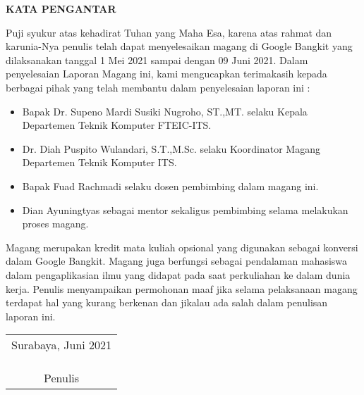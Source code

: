 \begin{center}
  \Large\textbf{KATA PENGANTAR}
\end{center}
\vspace{2ex}


Puji syukur atas kehadirat Tuhan yang Maha Esa, karena atas rahmat dan karunia-Nya penulis telah dapat menyelesaikan magang di Google Bangkit yang dilaksanakan tanggal 1 Mei 2021 sampai dengan 09 Juni 2021. Dalam penyelesaian Laporan Magang ini, kami mengucapkan terimakasih kepada berbagai pihak yang telah membantu dalam penyelesaian laporan ini :

\begin{itemize}
  \item Bapak Dr. Supeno Mardi Susiki Nugroho, ST.,MT. selaku Kepala Departemen Teknik Komputer FTEIC-ITS.
  \item Dr. Diah Puspito Wulandari, S.T.,M.Sc. selaku Koordinator Magang Departemen Teknik Komputer ITS.
  \item Bapak Fuad Rachmadi selaku dosen pembimbing dalam magang ini.
  \item Dian Ayuningtyas sebagai mentor sekaligus pembimbing selama melakukan proses magang.
\end{itemize}

Magang merupakan kredit mata kuliah opsional yang digunakan sebagai konversi dalam Google Bangkit. Magang juga berfungsi sebagai pendalaman mahasiswa dalam pengaplikasian ilmu yang didapat pada saat perkuliahan ke dalam dunia kerja. Penulis menyampaikan permohonan maaf jika selama pelaksanaan magang terdapat hal yang kurang berkenan dan jikalau ada salah dalam penulisan laporan ini.

\begin{flushright}
  \begin{tabular}[b]{c}
    Surabaya, Juni 2021
    \\
    \\
    \\
    \\
    Penulis
  \end{tabular}
\end{flushright}
